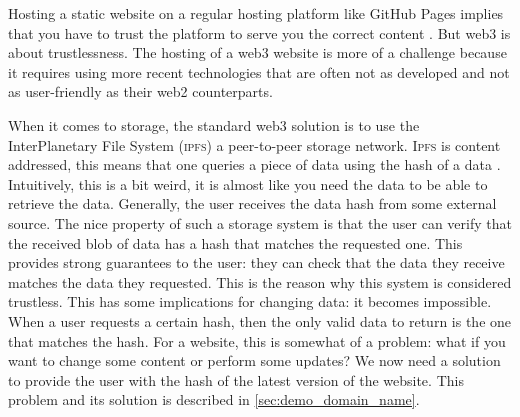 Hosting a static website on a regular hosting platform like GitHub Pages implies that you have to trust the platform to serve you the correct content%
.
But web3 is about trustlessness.
The hosting of a web3 website is more of a challenge because it requires using more recent technologies that are often not as developed and not as user-friendly as their web2 counterparts.

When it comes to storage, the standard web3 solution is to use the InterPlanetary File System (\textsc{ipfs}) a peer-to-peer storage network.
\textsc{Ipfs} is content addressed, this means that one queries a piece of data using the hash of a data%
.
Intuitively, this is a bit weird, it is almost like you need the data to be able to retrieve the data.
Generally, the user receives the data hash from some external source.
The nice property of such a storage system is that the user can verify that the received blob of data has a hash that matches the requested one.
This provides strong guarantees to the user: they can check that the data they receive matches the data they requested.
This is the reason why this system is considered trustless.
This has some implications for changing data: it becomes impossible.
When a user requests a certain hash, then the only valid data to return is the one that matches the hash.
For a website, this is somewhat of a problem: what if you want to change some content or perform some updates?
We now need a solution to provide the user with the hash of the latest version of the website.
This problem and its solution is described in \cref{sec:demo_domain_name}.

